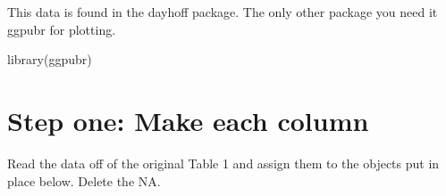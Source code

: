 \documentclass[
]{book}
\newenvironment{Shaded}{\begin{snugshade}}{\end{snugshade}}
\newcommand{\FunctionTok}[1]{\textcolor[rgb]{0.00,0.00,0.00}{#1}}
\newcommand{\NormalTok}[1]{#1}
\begin{document}
This data is found in the dayhoff package. The only other package you need it ggpubr for plotting.

\begin{Shaded}
\begin{Highlighting}[]
\FunctionTok{library}\NormalTok{(ggpubr)}
\end{Highlighting}
\end{Shaded}

\hypertarget{step-one-make-each-column}{%
\section{Step one: Make each column}\label{step-one-make-each-column}}

Read the data off of the original Table 1 and assign them to the objects put in place below. Delete the NA.
\end{document}
